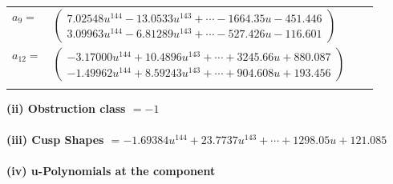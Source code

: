 \documentclass[1p]{elsarticle_modified}
\theoremstyle{definition}
\begin{document}
\begin{tabular}{m{7pt} m{180pt} m{7pt} m{180pt} }
\flushright $a_{9}=$&$\begin{pmatrix}7.02548 u^{144}-13.0533 u^{143}+\cdots-1664.35 u-451.446\\3.09963 u^{144}-6.81289 u^{143}+\cdots-527.426 u-116.601\end{pmatrix}$ \\
\flushright $a_{12}=$&$\begin{pmatrix}-3.17000 u^{144}+10.4896 u^{143}+\cdots+3245.66 u+880.087\\-1.49962 u^{144}+8.59243 u^{143}+\cdots+904.608 u+193.456\end{pmatrix}$\\&\end{tabular}
\flushleft \textbf{(ii) Obstruction class $= -1$}\\~\\
\flushleft \textbf{(iii) Cusp Shapes $= -1.69384 u^{144}+23.7737 u^{143}+\cdots+1298.05 u+121.085$}\\~\\
\newpage\renewcommand{\arraystretch}{1}
\flushleft \textbf{(iv) u-Polynomials at the component}\newline \\
\end{document}
